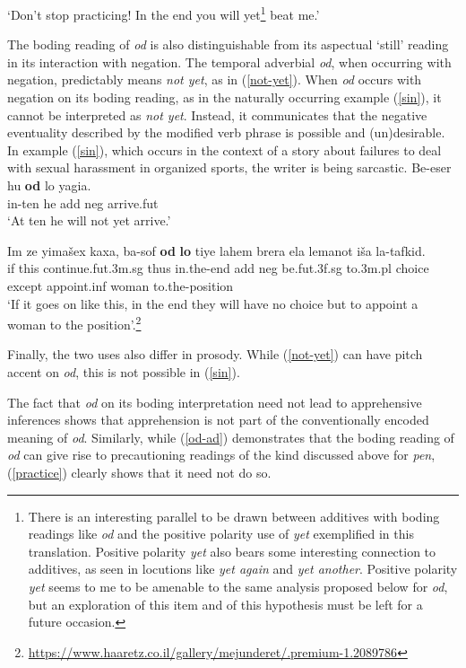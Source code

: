 \documentclass[output=paper,colorlinks,citecolor=brown]{langscibook}
\begin{document}
\glt `Don't stop practicing! In the end you will yet\footnote{There is an interesting parallel to be drawn between additives with boding readings like \textit{od} and the positive polarity use of \textit{yet} exemplified in this translation. Positive polarity \textit{yet} also bears some interesting connection to additives, as seen in locutions like \textit{yet again} and \textit{yet another}. Positive polarity \textit{yet} seems to me to be amenable to the same analysis proposed below for \textit{od}, but an exploration of this item and of this hypothesis must be left for a future occasion.} beat me.'
\z

The boding reading of  \textit{od} is also distinguishable from its aspectual   `still' reading in its interaction with negation. The temporal adverbial \textit{od}, when occurring with negation, predictably means \textit{not yet}, as in (\ref{not-yet}). When  \textit{od} occurs with negation on its boding reading, as in the naturally occurring example (\ref{sin}), it cannot be interpreted as \textit{not yet}. Instead, it communicates that the negative eventuality described by the modified verb phrase is possible and (un)desirable. In example (\ref{sin}), which occurs in the context of a story about failures to deal with sexual harassment in organized sports, the writer is being sarcastic. 
\ea
\label{not-yet}
\gll Be-eser  hu \textbf{od} lo yagia. \\
in-ten he {\sc add} {\sc neg} arrive.{\sc fut}\\
\glt `At ten he will not yet arrive.'
\z

\ea
\label{sin}
\gll Im ze yimašex kaxa, ba-sof \textbf{od} \textbf{lo} tiye lahem brera ela lemanot iša la-tafkid.\\
if this continue.{\sc fut.3m.sg} thus in.the-end {\sc add} {\sc neg} be.{\sc fut.3f.sg} to.{\sc 3m.pl} choice except appoint.{\sc inf} woman to.the-position \\
\glt `If it goes on like this, in the end they will have no choice but to appoint a woman to the position'.\footnote{ \url{https://www.haaretz.co.il/gallery/mejunderet/.premium-1.2089786}}
\z

\noindent Finally, the two uses also differ in prosody. While (\ref{not-yet}) can have pitch accent on \textit{od}, this is not possible in (\ref{sin}).

 The fact that \textit{od} on its boding interpretation need not lead to apprehensive inferences shows that apprehension is not part of the conventionally encoded meaning of \textit{od}. Similarly, while (\ref{od-ad}) demonstrates that the boding reading of \textit{od} can give rise to precautioning readings of the kind discussed above for \textit{pen},  (\ref{practice}) clearly shows that it need not do so. 
\end{document}
